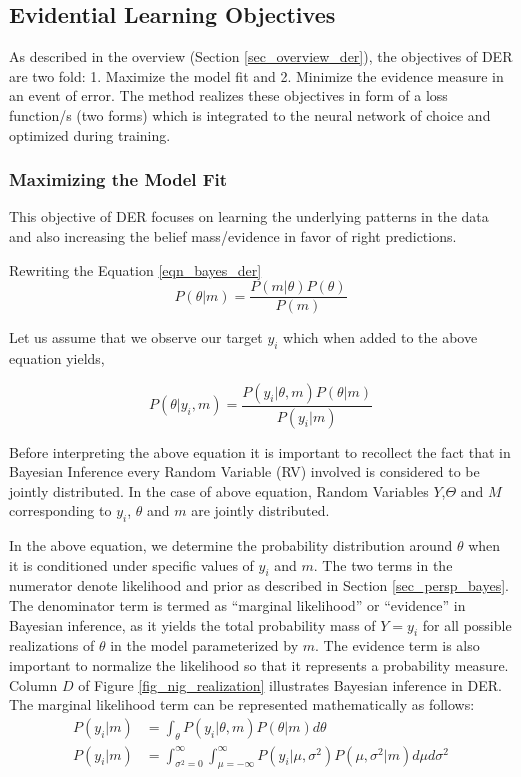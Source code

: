 	\subsection{Evidential Learning Objectives}\label{sec_evi_learning_objectives}
	As described in the overview (Section \ref{sec_overview_der}), the objectives of DER are two fold: 1. Maximize the model fit and 2. Minimize the evidence measure in an event of error. The method realizes these objectives in form of a loss function/s (two forms) which is integrated to the neural network of choice and optimized during training. 
	
	\subsubsection{Maximizing the Model Fit}
	This objective of DER focuses on learning the underlying patterns in the data and also increasing the belief mass/evidence in favor of right predictions.
	
	Rewriting the Equation \ref{eqn_bayes_der}
	\begin{equation*}
		P(\theta|m) = \frac{P(m|\theta)P(\theta)}{P(m)}
	\end{equation*}
	
	Let us assume that we observe our target $y_i$ which when added to the above equation yields,
	
	\begin{equation}
		P(\theta|y_i,m) = \frac{P(y_i|\theta,m)P(\theta|m)}{P(y_i|m)}
	\end{equation}
	
	Before interpreting the above equation it is important to recollect the fact that in Bayesian Inference every Random Variable (RV) involved is considered to be jointly distributed. In the case of above equation, Random Variables $Y$,$\Theta$ and $M$ corresponding to $y_i$, $\theta$ and $m$ are jointly distributed.
	
	In the above equation, we determine the probability distribution around $\theta$ when it is conditioned under specific values of  $y_i$ and $m$. The two terms in the numerator denote likelihood and prior as described in Section \ref{sec_persp_bayes}. The denominator term is termed as \enquote{marginal likelihood} or \enquote{evidence} in Bayesian inference, as it yields the total probability mass  of $Y=y_i$ for all possible realizations of $\theta$ in the model parameterized by $m$. The evidence term is also important to normalize the likelihood so that it represents a probability measure. Column $D$ of Figure \ref{fig_nig_realization} illustrates Bayesian inference in DER.
	The marginal likelihood term can be represented mathematically as follows:
	\begin{align}
		P(y_i|m) &= \int_{\theta}P(y_i|\theta,m)P(\theta|m)d\theta	\\
		P(y_i|m) &=\int_{\sigma^2=0}^{\infty}\int_{\mu=-\infty}^{\infty}P(y_i|\mu,\sigma^2)P(\mu,\sigma^2|m)d\mu d\sigma^2
	\end{align}
	
